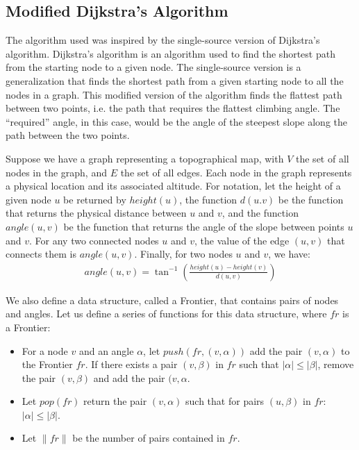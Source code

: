\documentclass[12pt]{article}
\begin{document}
\subsection{Modified Dijkstra's Algorithm}
\label{sub:the_algorithm}
\par The algorithm used was inspired by the single-source version of Dijkstra's algorithm. Dijkstra's algorithm is an algorithm used to find the shortest path from the starting node to a given node. The single-source version
is a generalization that finds the shortest path from a given starting node to all the nodes in a graph. This modified version of the algorithm finds the flattest path between two points, i.e. the path that requires the flattest climbing angle. The ``required'' angle, in this case, would be the angle of the steepest slope along the path between the two points.
\par Suppose we have a graph representing a topographical map, with $V$ the set of all nodes in the graph, and $E$ the set of all edges. Each node in the graph represents a physical location and its associated altitude. For notation, let the height of a given node $u$ be returned by $height(u)$, the function $d(u.v)$ be the function that returns the physical distance between $u$ and $v$, and the function $angle(u,v)$ be the function that returns the angle of the slope between points $u$ and $v$. For any two connected nodes $u$ and $v$, the value of the edge $(u,v)$ that connects them is $angle(u,v)$. Finally, for two nodes $u$ and $v$, we have:
\begin{align*}
  angle(u,v) = \tan^{-1}\left(\frac{height(u) - height(v)}{d(u,v)}\right)
\end{align*}
\pagebreak
\par We also define a data structure, called a Frontier, that contains pairs of nodes and angles. Let us define a series of functions for this data structure, where $fr$ is a Frontier:
\begin{itemize}
  \item For a node $v$ and an angle $\alpha$, let $push(fr, (v,\alpha))$ add the pair $(v, \alpha)$ to the Frontier $fr$. If there exists a pair $(v,\beta)$ in $fr$ such that $|\alpha| \leq |\beta|$, remove the pair $(v,\beta)$ and add the pair $(v,\alpha$.
  \item Let $pop(fr)$ return the pair $(v, \alpha)$ such that for pairs $(u,\beta)$ in $fr$: $|\alpha| \leq |\beta|$.
  \item Let $\|fr\|$ be the number of pairs contained in $fr$.
\end{itemize}
\end{document}
